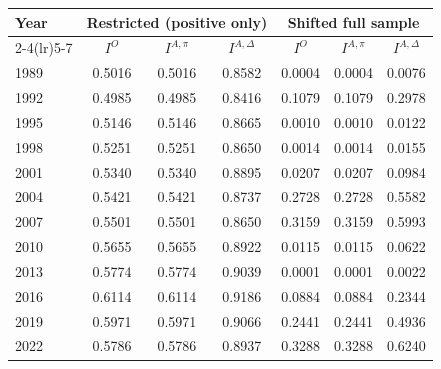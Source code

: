 \begin{tabular}{lcccccc}
\toprule
Year & \multicolumn{3}{c}{Restricted (positive only)} & \multicolumn{3}{c}{Shifted full sample} \\
\cmidrule(lr){2-4}\cmidrule(lr){5-7}
& $I^{O}$ & $I^{A,\pi}$ & $I^{A,\Delta}$ & $I^{O}$ & $I^{A,\pi}$ & $I^{A,\Delta}$ \\
\midrule
1989 & 0.5016 & 0.5016 & 0.8582 & 0.0004 & 0.0004 & 0.0076 \\
1992 & 0.4985 & 0.4985 & 0.8416 & 0.1079 & 0.1079 & 0.2978 \\
1995 & 0.5146 & 0.5146 & 0.8665 & 0.0010 & 0.0010 & 0.0122 \\
1998 & 0.5251 & 0.5251 & 0.8650 & 0.0014 & 0.0014 & 0.0155 \\
2001 & 0.5340 & 0.5340 & 0.8895 & 0.0207 & 0.0207 & 0.0984 \\
2004 & 0.5421 & 0.5421 & 0.8737 & 0.2728 & 0.2728 & 0.5582 \\
2007 & 0.5501 & 0.5501 & 0.8650 & 0.3159 & 0.3159 & 0.5993 \\
2010 & 0.5655 & 0.5655 & 0.8922 & 0.0115 & 0.0115 & 0.0622 \\
2013 & 0.5774 & 0.5774 & 0.9039 & 0.0001 & 0.0001 & 0.0022 \\
2016 & 0.6114 & 0.6114 & 0.9186 & 0.0884 & 0.0884 & 0.2344 \\
2019 & 0.5971 & 0.5971 & 0.9066 & 0.2441 & 0.2441 & 0.4936 \\
2022 & 0.5786 & 0.5786 & 0.8937 & 0.3288 & 0.3288 & 0.6240 \\
\bottomrule
\end{tabular}

